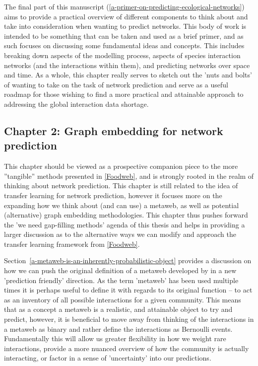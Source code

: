 The final part of this manuscript (\autoref{a-primer-on-predicting-ecological-networks}) aims to provide a practical overview of different components to think about and take into consideration when wanting to predict networks. This body of work is intended to be something that can be taken and used as a brief primer, and as such focuses on discussing some fundamental ideas and concepts. This includes breaking down aspects of the modelling process, aspects of species interaction networks (and the interactions within them), and predicting networks over space and time. As a whole, this chapter really serves to sketch out the 'nuts and bolts' of wanting to take on the task of network prediction and serve as a useful roadmap for those wishing to find a more practical and attainable approach to addressing the global interaction data shortage.

\subsection{Chapter 2: Graph embedding for network prediction}

This chapter should be viewed as a prospective companion piece to the more ''tangible'' methods presented in \autoref{Foodweb}, and is strongly rooted in the realm of thinking about network prediction. This chapter is still related to the idea of transfer learning for network prediction, however it focuses more on the expanding how we think about (and can use) a metaweb, as well as potential (alternative) graph embedding methodologies. This chapter thus pushes forward the 'we need gap-filling methods' agenda of this thesis and helps in providing a larger discussion as to the alternative ways we can modify and approach the transfer learning framework from \autoref{Foodweb}.

Section~\ref{a-metaweb-is-an-inherently-probabilistic-object} provides a discussion on how we can push the original definition of a metaweb developed by \cite{Dunne2006NetStr} in a new 'prediction friendly' direction. As the term 'metaweb' has been used multiple times it is perhaps useful to define it with regards to its original function -- to act as an inventory of all possible interactions for a given community. This means that as a concept a metaweb is a realistic, and attainable object to try and predict, however, it is beneficial to move away from thinking of the interactions in a metaweb as binary and rather define the interactions as Bernoulli events. Fundamentally this will allow us greater flexibility in how we weight rare interactions, provide a more nuanced overview of how the community is actually interacting, or factor in a sense of 'uncertainty' into our predictions.

